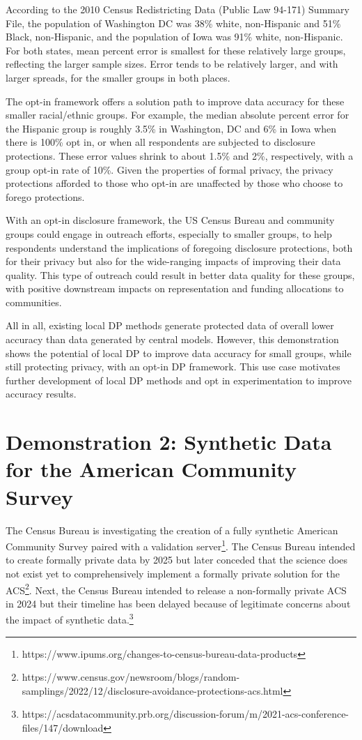 \documentclass[
]{urban-formatting}
\begin{document}
According to the 2010 Census Redistricting Data (Public Law 94-171)
Summary File, the population of Washington DC was 38\% white,
non-Hispanic and 51\% Black, non-Hispanic, and the population of Iowa
was 91\% white, non-Hispanic. For both states, mean percent error is
smallest for these relatively large groups, reflecting the larger sample
sizes. Error tends to be relatively larger, and with larger spreads, for
the smaller groups in both places.

The opt-in framework offers a solution path to improve data accuracy for
these smaller racial/ethnic groups. For example, the median absolute
percent error for the Hispanic group is roughly 3.5\% in Washington, DC
and 6\% in Iowa when there is 100\% opt in, or when all respondents are
subjected to disclosure protections. These error values shrink to about
1.5\% and 2\%, respectively, with a group opt-in rate of 10\%. Given the
properties of formal privacy, the privacy protections afforded to those
who opt-in are unaffected by those who choose to forego protections.

With an opt-in disclosure framework, the US Census Bureau and community
groups could engage in outreach efforts, especially to smaller groups,
to help respondents understand the implications of foregoing disclosure
protections, both for their privacy but also for the wide-ranging
impacts of improving their data quality. This type of outreach could
result in better data quality for these groups, with positive downstream
impacts on representation and funding allocations to communities.

All in all, existing local DP methods generate protected data of overall
lower accuracy than data generated by central models. However, this
demonstration shows the potential of local DP to improve data accuracy
for small groups, while still protecting privacy, with an opt-in DP
framework. This use case motivates further development of local DP
methods and opt in experimentation to improve accuracy results.

\section{Demonstration 2: Synthetic Data for the American Community Survey}

The Census Bureau is investigating the creation of a fully synthetic
American Community Survey paired with a validation server\footnote{https://www.ipums.org/changes-to-census-bureau-data-products}.
The Census Bureau intended to create formally private data by 2025 but
later conceded that the science does not exist yet to comprehensively
implement a formally private solution for the ACS\footnote{https://www.census.gov/newsroom/blogs/random-samplings/2022/12/disclosure-avoidance-protections-acs.html}.
Next, the Census Bureau intended to release a non-formally private ACS
in 2024 but their timeline has been delayed because of legitimate
concerns about the impact of synthetic data.\footnote{https://acsdatacommunity.prb.org/discussion-forum/m/2021-acs-conference-files/147/download}
\end{document}
